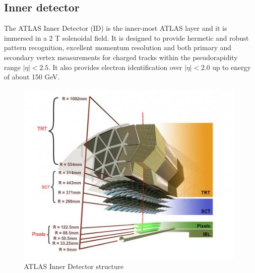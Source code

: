 \documentclass[a4paper, oneside]{book}
\begin{document}
				\subsection{Inner detector}
					The ATLAS Inner Detector (ID) is the inner-most ATLAS layer and it is immersed in a 2 T solenoidal field. It is designed to provide hermetic and robust pattern recognition, excellent momentum resolution and both primary and secondary vertex measurements for charged tracks within the pseudorapidity range $|\eta|<2.5$. It also provides electron identification over $|\eta|<2.0$ up to energy of about 150 GeV. 
					\begin{figure}[H]
						\centering
						\includegraphics[width=0.45\textheight]{tesi_images/ID_structure.jpg}
						\caption{ATLAS Inner Detector structure}
					\end{figure}
					
\end{document}
